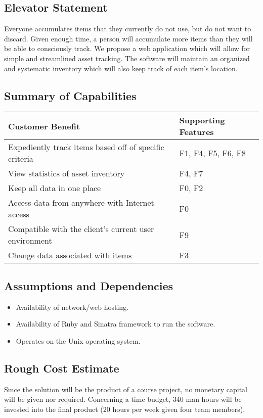 \documentclass{article}
\begin{document}
\subsection{Elevator Statement}
Everyone accumulates items that they currently do not use, but do not want to discard.  Given enough time, a person will accumulate more items than they will be able to consciously track. We propose a web application which will allow for simple and streamlined asset tracking. The software will maintain an organized and systematic inventory which will also keep track of each item's location.

\subsection{Summary of Capabilities}
\begin{tabular}{ | p{4.0in} | p{2.0in} | }
\hline
\textbf{Customer Benefit} & \textbf{Supporting Features}\\
\hline
\hline
Expediently track items based off of specific criteria & F1, F4, F5, F6, F8\\
\hline
View statistics of asset inventory & F4, F7\\
\hline
Keep all data in one place & F0, F2\\
\hline
Access data from anywhere with Internet access & F0\\
\hline
Compatible with the client's current user environment & F9\\
\hline
Change data associated with items & F3\\
\hline
\end{tabular}
\clearpage
\subsection{Assumptions and Dependencies}
\begin{itemize}
\item Availability of network/web hosting.
\item Availability of Ruby and Sinatra framework to run the software.
\item Operates on the Unix operating system.
\end{itemize}

\subsection{Rough Cost Estimate}
Since the solution will be the product of a course project, no monetary capital will be given nor required.  Concerning a time budget, 340 man hours will be invested into the final product (20 hours per week given four team members).
\end{document}
